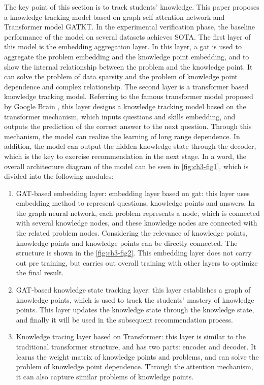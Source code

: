 The key point of this section is to track students' knowledge. This paper proposes a knowledge tracking model based on graph self attention network and Transformer model GATKT. In the experimental verification phase, the baseline performance of the model on several datasets achieves SOTA. The first layer of this model is the embedding aggregation layer. In this layer, a gat is used to aggregate the problem embedding and the knowledge point embedding, and to show the internal relationship between the problem and the knowledge point. It can solve the problem of data sparsity and the problem of knowledge point dependence and complex relationship. The second layer is a transformer based knowledge tracking model. Referring to the famous transformer model proposed by Google Brain \cite{vaswani2017attention}, this layer designs a knowledge tracking model based on the transformer mechanism, which inputs questions and skills embedding, and outputs the prediction of the correct answer to the next question. Through this mechanism, the model can realize the learning of long range dependence. In addition, the model can output the hidden knowledge state through the decoder, which is the key to exercise recommendation in the next stage. In a word, the overall architecture diagram of the model can be seen in \figurename{\ref{fig:ch3-fig1}}, which is divided into the following modules:
\begin{enumerate}
	\item GAT-based embedding layer: embedding layer based on gat: this layer uses embedding method to represent questions, knowledge points and answers. In the graph neural network, each problem represents a node, which is connected with several knowledge nodes, and these knowledge nodes are connected with the related problem nodes. Considering the relevance of knowledge points, knowledge points and knowledge points can be directly connected. The structure is shown in the \figurename{\ref{fig:ch3-fig2}}. This embedding layer does not carry out pre training, but carries out overall training with other layers to optimize the final result.
	\item GAT-based knowledge state tracking layer: this layer establishes a graph of knowledge points, which is used to track the students' mastery of knowledge points. This layer updates the knowledge state through the knowledge state, and finally it will be used in the subsequent recommendation process.
	\item Knowledge tracing layer based on Transformer: this layer is similar to the traditional transformer structure, and has two parts: encoder and decoder. It learns the weight matrix of knowledge points and problems, and can solve the problem of knowledge point dependence. Through the attention mechanism, it can also capture similar problems of knowledge points.
\end{enumerate}


